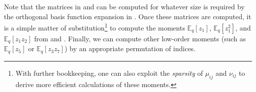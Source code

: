 Note that the matrices in  and 
can be computed for whatever size is required by the orthogonal basis function
expansion in .
Once these matrices are computed, it is a simple matter of
substitution\footnote{With further bookkeeping, one can also exploit the
\textit{sparsity} of $\mu_{ij}$ and $\nu_{ij}$ to derive more efficient
calculations of these moments.}
to compute the moments $\mathbb{E}_q[z_1]$, $\mathbb{E}_q[z_1^2]$, and
$\mathbb{E}_q[z_1 z_2]$ from  and .
Finally, we can compute other low-order moments
(such as $\mathbb{E}_q[z_5]$ or $\mathbb{E}_q[z_3 z_7]$) by an appropriate
permutation of indices.

%
